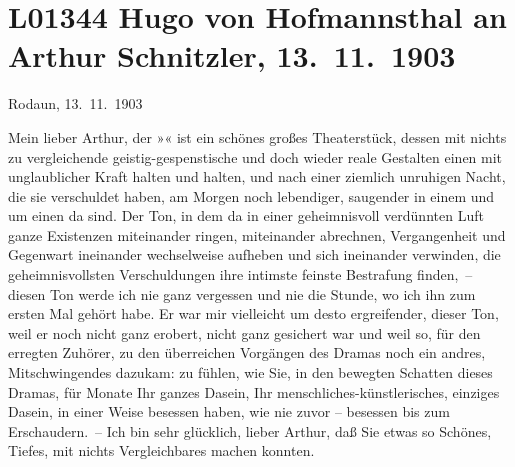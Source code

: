 

\section[Hugo von Hofmannsthal an Arthur Schnitzler, 13. 11. 1903]{L01344 Hugo von Hofmannsthal an Arthur Schnitzler, 13. 11. 1903}
\nopagebreak{}
\rehead{ }\normalsize\beginnumbering{}
\toendnotes[C]{\smallbreak\pagebreak[2]}
\toendnotes[C]{\smallbreak}
\toendnotes[C]{\smallbreak}
\pstart
           \raggedleft{}{\pb}Rodaun, 13. 11. 1903\pend
           
\pstart{}Mein lieber Arthur,\pend\vspace{0.5em}
\pstart
           der »« ist ein schönes großes Theaterstück, dessen mit nichts zu vergleichende
               geistig-gespenstische und doch wieder reale Gestalten einen mit unglaublicher Kraft
               halten und halten, und nach einer ziemlich unruhigen Nacht, die sie verschuldet
               haben, am Morgen noch lebendiger, saugender in einem und um einen da sind. Der Ton,
               in dem da in einer geheimnisvoll verdünnten Luft ganze Existenzen miteinander ringen,
               miteinander abrechnen, Vergangenheit und Gegenwart ineinander wechselweise aufheben
               und sich ineinander verwinden, die geheimnisvollsten Verschuldungen ihre intimste
               feinste Bestrafung finden, – diesen Ton werde ich nie ganz vergessen und nie die
               Stunde, wo ich ihn zum ersten Mal gehört habe. Er war mir vielleicht um desto
               ergreifender, dieser Ton, weil er noch nicht ganz erobert, nicht ganz gesichert war
               und weil so, für den erregten Zuhörer, zu den überreichen Vorgängen des Dramas noch
               ein andres, Mitschwingendes dazukam: zu fühlen, wie Sie, in den bewegten Schatten
               dieses Dramas, für Monate Ihr ganzes Dasein, Ihr menschliches-künstlerisches,
               einziges Dasein, in einer Weise besessen haben, wie nie zuvor – besessen bis zum
               Erschaudern. – Ich bin sehr glücklich, lieber Arthur, daß Sie etwas so Schönes,
               Tiefes, mit nichts Vergleichbares machen konnten.\pend
           
